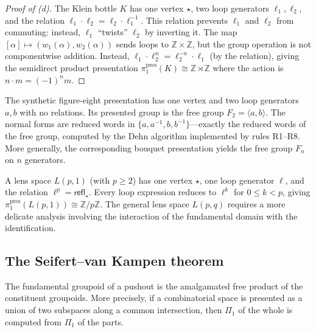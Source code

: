 \documentclass[manuscript]{BSLstyle}
\newcommand{\refl}{\mathsf{refl}}
\newcommand{\Z}{\mathbb{Z}}
\begin{document}
\begin{proof}[Proof of (d)]
The Klein bottle $K$ has one vertex $\star$, two loop generators
$\ell_1, \ell_2$, and the relation $\ell_1 \cdot \ell_2 = \ell_2 \cdot \ell_1^{-1}$.
This relation prevents $\ell_1$ and $\ell_2$ from commuting: instead,
$\ell_1$ ``twists'' $\ell_2$ by inverting it.  The map
$[\alpha] \mapsto (w_1(\alpha), w_2(\alpha))$ sends loops to
$\Z \times \Z$, but the group operation is not componentwise addition.
Instead, $\ell_1 \cdot \ell_2^n = \ell_2^{-n} \cdot \ell_1$ (by the relation),
giving the semidirect product presentation
$\pi_1^{\mathrm{pres}}(K) \cong \Z \rtimes \Z$ where the action is
$n \cdot m = (-1)^n m$.
\end{proof}

\begin{example}\label{ex:figure-eight}
The synthetic figure-eight presentation has one vertex and two loop
generators $a, b$ with no relations.  Its presented group is the
free group $F_2 = \langle a, b \rangle$.  The normal forms are reduced
words in $\{a, a^{-1}, b, b^{-1}\}$---exactly the reduced words of the
free group, computed by the Dehn algorithm implemented by rules R1--R8.
More generally, the corresponding bouquet presentation yields the free group
$F_n$ on $n$ generators.
\end{example}

\begin{example}\label{ex:lens-spaces}
A lens space $L(p, 1)$ (with $p \geq 2$) has one vertex $\star$, one
loop generator $\ell$, and the relation $\ell^p = \refl_\star$.
Every loop expression reduces to $\ell^k$ for $0 \leq k < p$, giving
$\pi_1^{\mathrm{pres}}(L(p, 1)) \cong \Z/p\Z$.  The general lens space $L(p, q)$
requires a more delicate analysis involving the interaction of the
fundamental domain with the identification.
\end{example}

\subsection{The Seifert--van Kampen theorem}

\begin{theorem}\label{thm:svk}
The fundamental groupoid of a pushout is the amalgamated free product of
the constituent groupoids.  More precisely, if a combinatorial space
is presented as a union of two subspaces along a common intersection,
then $\Pi_1$ of the whole is computed from $\Pi_1$ of the parts.
\end{theorem}
\end{document}
